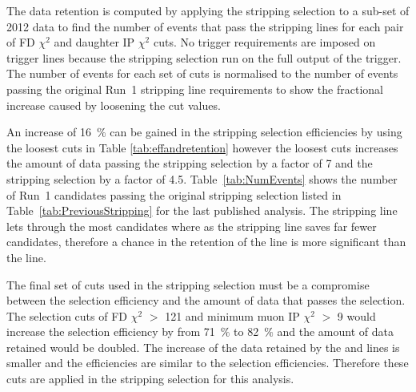The data retention is computed by applying the stripping selection to a sub-set of 2012 data to find the number of events that pass the stripping lines for each pair of FD $\chi^{2}$ and daughter IP $\chi^{2}$ cuts. No trigger requirements are imposed on trigger lines because the stripping selection run on the full output of the trigger. The number of events for each set of cuts is normalised to the number of events passing the original Run~1 stripping line requirements  to show the fractional increase caused by loosening the cut values. 

An increase of 16~$\%$ can be gained in the stripping selection efficiencies by using the loosest cuts in Table \ref{tab:effandretention} however the loosest cuts increases the amount of data passing the \bmumu stripping selection by a factor of 7 and the \bhh stripping selection by a factor of 4.5. Table~\ref{tab:NumEvents} shows the number of Run~1 candidates passing the original stripping selection listed in Table~\ref{tab:PreviousStripping} for the last published analysis. The \bhh stripping line lets through the most candidates where as the \bmumu stripping line saves far fewer candidates, therefore a chance in the retention of the \bhh line is more significant than the \bmumu line. 


The final set of cuts used in the stripping selection must be a compromise between the selection efficiency and the amount of data that passes the selection. The selection cuts of \bs FD $\chi^{2}$ $>$ 121 and minimum muon IP $\chi^{2}$ $>$ 9 would increase the \bmumu selection efficiency by from 71~$\%$ to 82~$\%$ and the amount of data retained would be doubled. The increase of the data retained by the \bhh and \bujpsik lines is smaller and the efficiencies are similar to the \bmumu selection efficiencies. Therefore these cuts are applied in the stripping selection for this analysis. %



